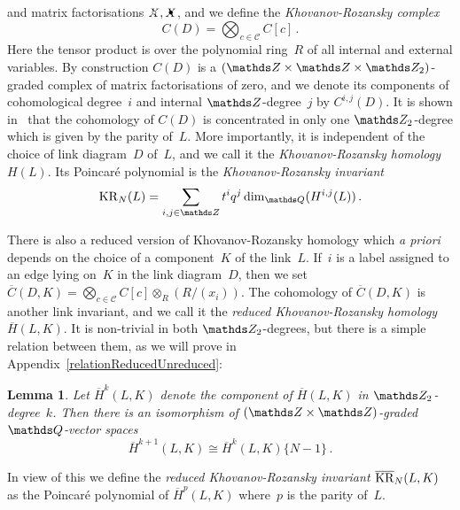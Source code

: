 \documentclass{compositio}
\newtheorem{lemma}[theorem]{Lemma}
\theoremstyle{definition}
\numberwithin{equation}{section}
\begin{document}
\begin{minipage}{0.48cm}     
\end{minipage} 
and matrix factorisations $\Xcirc, \Xbul$, and we define the \emph{Khovanov-Rozansky complex}
$$
C(D) = \bigotimes_{c\in\mathcal C} C[c] \, .
$$
Here the tensor product is over the polynomial ring~$R$ of all internal and external variables. By construction $C(D)$ is a $(\nZ\times\nZ\times\nZ_{2})$-graded complex of matrix factorisations of zero, and we denote its components of cohomological degree~$i$ and internal $\nZ$-degree~$j$ by $C^{i,j}(D)$. It is shown in~\cite{kr0401268} that the cohomology of $C(D)$ is concentrated in only one $\nZ_{2}$-degree which is given by the parity of~$L$. More importantly, it is independent of the choice of link diagram~$D$ of~$L$, and we call it the \emph{Khovanov-Rozansky homology $H(L)$}. Its Poincar\'e polynomial is the \emph{Khovanov-Rozansky invariant}
$$
\KR_{N}(L) = \sum_{i,j\in\nZ} t^{i} q^j \dim_{\nQ}(H^{i,j}(L)) \, . 
$$

There is also a reduced version of Khovanov-Rozansky homology which \emph{a priori} depends on the choice of a component~$K$ of the link~$L$. If~$i$ is a label assigned to an edge lying on~$K$ in the link diagram~$D$, then we set $\overline{C}(D,K)=\bigotimes_{c\in\mathcal C} C[c] \otimes_{R}(R/(x_{i}))$. The cohomology of $\overline{C}(D,K)$ is another link invariant, and we call it the \emph{reduced Khovanov-Rozansky homology $\overline{H}(L,K)$}. It is non-trivial in both $\nZ_{2}$-degrees, but there is a simple relation between them, as we will prove in Appendix~\ref{relationReducedUnreduced}: 
\begin{lemma}
\label{Z2gradingReduced}
Let $\overline{H}^k(L,K)$ denote the component of $\overline{H}(L,K)$ in $\nZ_{2}$-degree~$k$. Then there is an isomorphism of $(\nZ\times\nZ)$-graded $\nQ$-vector spaces 
$$
\overline{H}^{k+1}(L,K) \cong \overline{H}^k(L,K)\{N-1\} \, .
$$
\end{lemma}
In view of this we define the \emph{reduced Khovanov-Rozansky invariant $\overline{\operatorname{KR}}_{N}(L,K)$} as the Poincar\'e polynomial of $\overline{H}^p(L,K)$ where~$p$ is the parity of~$L$. 
\end{document}
